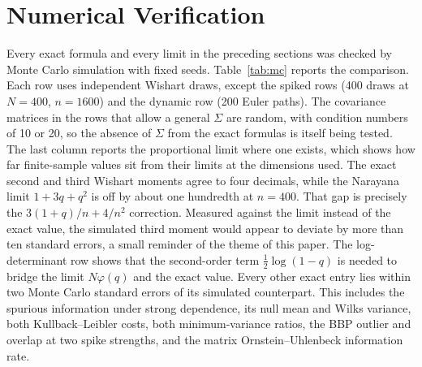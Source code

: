 \section*{Numerical Verification}

Every exact formula and every limit in the preceding sections was checked by Monte Carlo simulation with fixed seeds. Table~\ref{tab:mc} reports the comparison. Each row uses \MCReps{} independent Wishart draws, except the spiked rows (400 draws at $N=400$, $n=1600$) and the dynamic row (200 Euler paths). The covariance matrices in the rows that allow a general $\Sigma$ are random, with condition numbers of 10 or 20, so the absence of $\Sigma$ from the exact formulas is itself being tested. The last column reports the proportional limit where one exists, which shows how far finite-sample values sit from their limits at the dimensions used. The exact second and third Wishart moments agree to four decimals, while the Narayana limit $1+3q+q^2$ is off by about one hundredth at $n=400$. That gap is precisely the $3(1+q)/n+4/n^2$ correction. Measured against the limit instead of the exact value, the simulated third moment would appear to deviate by more than ten standard errors, a small reminder of the theme of this paper. The log-determinant row shows that the second-order term $\tfrac12\log(1-q)$ is needed to bridge the limit $N\varphi(q)$ and the exact value. Every other exact entry lies within two Monte Carlo standard errors of its simulated counterpart. This includes the spurious information under strong dependence, its null mean and Wilks variance, both Kullback--Leibler costs, both minimum-variance ratios, the BBP outlier and overlap at two spike strengths, and the matrix Ornstein--Uhlenbeck information rate.

\begin{table}[htbp]
\centering
\caption{Monte Carlo verification of the exact and limiting formulas. ``Exact or limit'' is the analytic value used for the comparison. For the spiked rows and the dynamic row this is the large-$N$ limit or the continuous-time value. The final column gives the proportional limit where it differs. Dimensions: moments and log-determinant at $N=100$, $n=400$. Information rows at $(p,r,n)=(10,20,100)$. Kullback--Leibler rows at $N=20$, $n=100$. Portfolio rows at $N=50$, $n=200$. BBP rows at $N=400$, $n=1600$. Matrix OU at $N=10$, $a=\tfrac12$, $b=1$, Euler step $0.01$ over $20$ time units.}
\label{tab:mc}
\small

\end{table}

